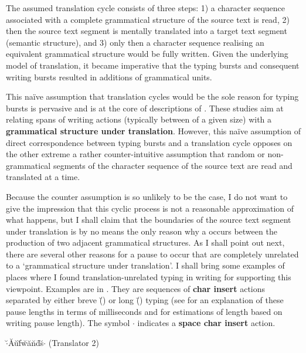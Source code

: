 \documentclass[output=paper]{LSP/langsci}
\begin{document}
The assumed translation cycle consists of three steps: 1) a character sequence associated with a complete grammatical structure of the source text is read, 2) then the source text segment is mentally translated into a target text segment (semantic structure), and 3) only then a character sequence realising an equivalent grammatical structure would be fully written. Given the underlying model of translation, it became imperative that the typing bursts and consequent writing bursts resulted in additions of grammatical units.

This naïve assumption that translation cycles would be the sole reason for typing bursts is pervasive and is at the core of descriptions of . These studies aim at relating spans of writing actions (typically between  of a given size) with a \textbf{grammatical structure under translation}. However, this naïve assumption of direct correspondence between typing bursts and a translation cycle opposes on the other extreme a rather counter-intuitive assumption that random or non-grammatical segments of the character sequence of the source text are read and translated at a time.

Because the counter assumption is so unlikely to be the case, I do not want to give the impression that this cyclic process is not a reasonable approximation of what happens, but I shall claim that the boundaries of the source text segment under translation is by no means the only reason why a  occurs between the production of two adjacent grammatical structures. As I shall point out next, there are several other reasons for a pause to occur that are completely unrelated to a `grammatical structure under translation'. I shall bring some examples of places where I found translation-unrelated typing  in writing for supporting this viewpoint. Examples are in . They are sequences of \textbf{char insert} actions separated by either breve (\u{ }) or long (\={ }) typing  (see  for an explanation of these pause lengths in terms of milliseconds and for estimations of  length based on writing pause length). The symbol $\cdot$ indicates a \textbf{space char insert} action.

\begin{exe}%
  \ex\label{couto:ex:1}$\cdot$\u{ }A\u{ }u\u{ }f\u{ }w\u{ }a\u{ }n\u{ }d\={ }s\u{ }$\cdot$ (Translator 2)
\end{exe}
\end{document}
